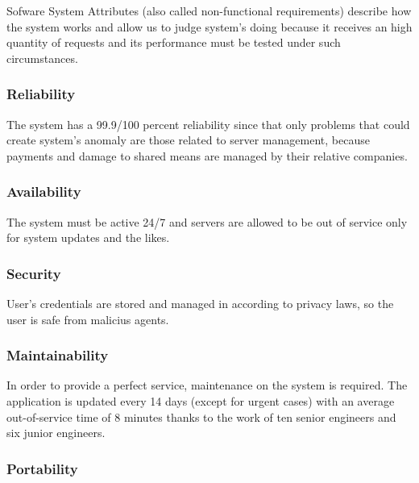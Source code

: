Sofware System Attributes (also called non-functional requirements) describe how the system works and allow us to judge system's doing because it receives an high quantity of requests and its performance must be tested under such circumstances.

\subsubsection{Reliability}
The system has a 99.9/100 percent reliability since that only problems that could create system's anomaly are those related to server management, because payments and damage to shared means are managed by their relative companies.

\subsubsection{Availability}
The system must be active 24/7 and servers are allowed to be out of service only for system updates and the likes.

\subsubsection{Security}
User's credentials are stored and managed in according to privacy laws, so the user is safe from malicius agents.

\subsubsection{Maintainability}
In order to provide a perfect service, maintenance on the system is required. The application is updated every 14 days (except for urgent cases) with an average out-of-service time of 8 minutes thanks to the work of ten senior engineers and six junior engineers.

\subsubsection{Portability}
